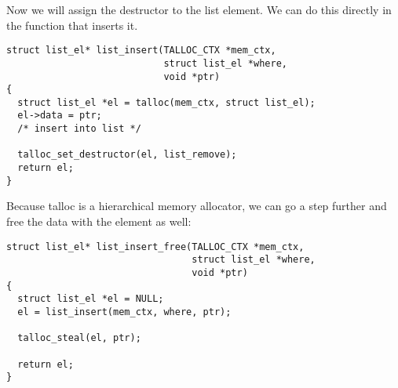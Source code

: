 \noindent
Now we will assign the destructor to the list element. We can do this directly
in the function that inserts it.

\begin{lstlisting}[caption={Remove an element from the list when freed},
morekeywords={talloc_set_destructor}]
struct list_el* list_insert(TALLOC_CTX *mem_ctx,
                            struct list_el *where,
                            void *ptr)
{
  struct list_el *el = talloc(mem_ctx, struct list_el);
  el->data = ptr;
  /* insert into list */
  
  talloc_set_destructor(el, list_remove);
  return el;
}
\end{lstlisting}

\noindent
Because talloc is a hierarchical memory allocator, we can go a step further and
free the data with the element as well:

\begin{lstlisting}[caption={Free the data with the list element},
morekeywords={talloc_steal}]
struct list_el* list_insert_free(TALLOC_CTX *mem_ctx,
                                 struct list_el *where,
                                 void *ptr)
{
  struct list_el *el = NULL;
  el = list_insert(mem_ctx, where, ptr);

  talloc_steal(el, ptr);

  return el;
}
\end{lstlisting}

